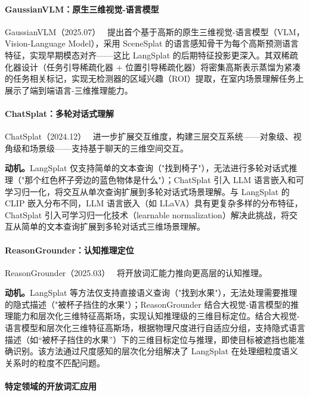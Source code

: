 \paragraph{GaussianVLM：原生三维视觉-语言模型} GaussianVLM（2025.07）~\cite{2507_00886} 提出首个基于高斯的原生三维视觉-语言模型（VLM，Vision-Language Model），采用 SceneSplat 的语言感知骨干为每个高斯预测语言特征，实现早期模态对齐——这比 LangSplat 的后期特征投影更深入。其双稀疏化器设计（任务引导稀疏化器 + 位置引导稀疏化器）将密集高斯表示蒸馏为紧凑的任务相关标记，实现无检测器的区域兴趣（ROI）提取，在室内场景理解任务上展示了端到端语言-三维推理能力。

\paragraph{ChatSplat：多轮对话式理解} ChatSplat（2024.12）~\cite{2412_00734} 进一步扩展交互维度，构建三层交互系统——对象级、视角级和场景级——支持基于聊天的三维空间交互。

\textbf{动机。}LangSplat 仅支持简单的文本查询（"找到椅子"），无法进行多轮对话式推理（"那个红色杯子旁边的蓝色物体是什么"）；ChatSplat 引入 LLM 语言嵌入和可学习归一化，将交互从单次查询扩展到多轮对话式场景理解。与 LangSplat 的 CLIP 嵌入分布不同，LLM 语言嵌入（如 LLaVA）具有更复杂多样的分布特征，ChatSplat 引入可学习归一化技术（learnable normalization）解决此挑战，将交互从简单的文本查询扩展到多轮对话式三维场景理解。

\paragraph{ReasonGrounder：认知推理定位} ReasonGrounder（2025.03）~\cite{2503_23297} 将开放词汇能力推向更高层的认知推理。

\textbf{动机。}LangSplat 等方法仅支持直接语义查询（"找到水果"），无法处理需要推理的隐式描述（"被杯子挡住的水果"）；ReasonGrounder 结合大视觉-语言模型的推理能力和层次化三维特征高斯场，实现认知推理级的三维目标定位。结合大视觉-语言模型和层次化三维特征高斯场，根据物理尺度进行自适应分组，支持隐式语言描述（如``被杯子挡住的水果''）下的三维目标定位与推理，即使目标被遮挡也能准确识别。该方法通过尺度感知的层次化分组解决了 LangSplat 在处理细粒度语义关系时的粒度不匹配问题。

\paragraph{特定领域的开放词汇应用}

